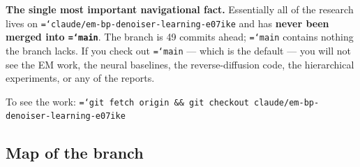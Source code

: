 \documentclass[11pt,a4paper]{article}
\newcommand{\code}[1]{\texttt{\small\hyphenchar\font=`\-\relax #1}}
\begin{document}
\begin{keybox}
\textbf{The single most important navigational fact.} Essentially all of the research
lives on \code{claude/em-bp-denoiser-learning-e07ike} and has \textbf{never been merged
into \code{main}}. The branch is 49 commits ahead; \code{main} contains nothing the branch
lacks. If you check out \code{main} --- which is the default --- you will not see the EM
work, the neural baselines, the reverse-diffusion code, the hierarchical experiments, or
any of the reports.

\medskip
To see the work:
\code{git fetch origin \&\& git checkout claude/em-bp-denoiser-learning-e07ike}
\end{keybox}

\subsection{Map of the branch}
\end{document}
